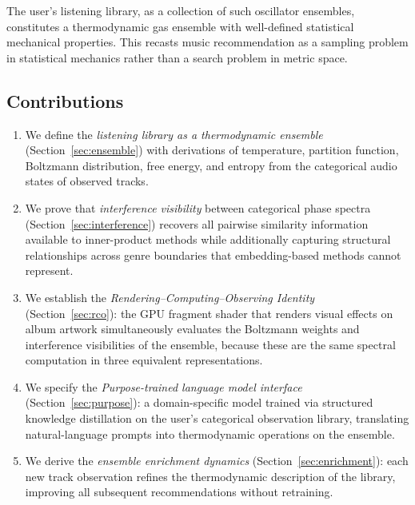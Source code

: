 \documentclass[11pt,twocolumn,a4paper]{article}
\begin{document}
The user's listening library, as a collection of such oscillator
ensembles, constitutes a thermodynamic gas ensemble with well-defined
statistical mechanical properties. This recasts music recommendation as
a sampling problem in statistical mechanics rather than a search problem
in metric space.

\subsection{Contributions}

\begin{enumerate}[leftmargin=*,itemsep=2pt]
\item We define the \emph{listening library as a thermodynamic
  ensemble} (Section~\ref{sec:ensemble}) with derivations of
  temperature, partition function, Boltzmann distribution, free energy,
  and entropy from the categorical audio states of observed tracks.

\item We prove that \emph{interference visibility} between categorical
  phase spectra (Section~\ref{sec:interference}) recovers all pairwise
  similarity information available to inner-product methods while
  additionally capturing structural relationships across genre
  boundaries that embedding-based methods cannot represent.

\item We establish the \emph{Rendering--Computing--Observing Identity}
  (Section~\ref{sec:rco}): the GPU fragment shader that renders visual
  effects on album artwork simultaneously evaluates the Boltzmann
  weights and interference visibilities of the ensemble, because these
  are the same spectral computation in three equivalent representations.

\item We specify the \emph{Purpose-trained language model interface}
  (Section~\ref{sec:purpose}): a domain-specific model trained via
  structured knowledge distillation on the user's categorical
  observation library, translating natural-language prompts into
  thermodynamic operations on the ensemble.

\item We derive the \emph{ensemble enrichment dynamics}
  (Section~\ref{sec:enrichment}): each new track observation refines
  the thermodynamic description of the library, improving all
  subsequent recommendations without retraining.
\end{enumerate}
\end{document}

